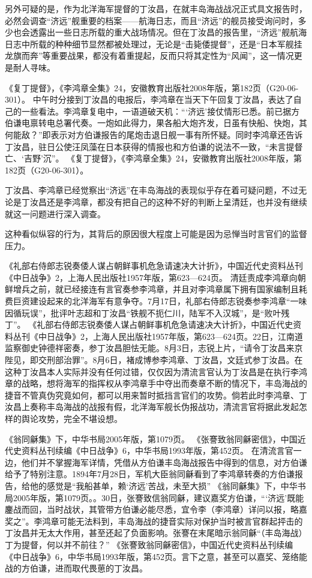 \documentclass[12pt,UTF8]{ctexbook}
\begin{document}
另外可疑的是，作为北洋海军提督的丁汝昌，在就丰岛海战战况正式具文报告时，必然会调查“济远”舰重要的档案——航海日志，而且“济远”的舰员接受询问时，多少也会透露出一些日志所载的重大战场情况。但在丁汝昌的报告里，“济远”舰航海日志中所载的种种细节显然都被处理过，无论是“击毙倭提督”，还是“日本军舰挂龙旗而奔”等重要战果，都没有着重提起，反而只将其定性为“风闻”，这一情况更是耐人寻味。

《复丁提督》，《李鸿章全集》24，安徽教育出版社2008年版，第182页（G20-06-301）。
中午时分接到丁汝昌的电报后，李鸿章在当天下午回复丁汝昌，表达了自己的一些看法。李鸿章复电中，一语道破天机：“‘济远’接仗情形已悉。前已据方伯谦电禀转电总署代奏。一炮如此得力，果各船大炮齐发，日虽有快船、快炮，其何能敌？”即表示对方伯谦报告的尾炮击退日舰一事有所怀疑。同时李鸿章还告诉丁汝昌，驻日公使汪凤藻在日本获得的情报也和方伯谦的说法不一致，“未言提督亡、‘吉野’沉”。 《复丁提督》，《李鸿章全集》24，安徽教育出版社2008年版，第182页（G20-06-301）。

丁汝昌、李鸿章已经觉察出“济远”在丰岛海战的表现似乎存在着可疑问题，不过无论是丁汝昌还是李鸿章，都没有把自己的这种不好的判断上呈清廷，也并没有继续就这一问题进行深入调查。

这种看似纵容的行为，其背后的原因很大程度上可能是因为忌惮当时言官们的监督压力。

《礼部右侍郎志锐奏倭人谋占朝鲜事机危急请速决大计折》，中国近代史资料丛刊《中日战争》2，上海人民出版社1957年版，第623—624页。
清廷责成李鸿章向朝鲜增兵之前，就已经接连有言官奏参李鸿章，并且对李鸿章属下拥有国家编制且耗费巨资建设起来的北洋海军有意争夺。7月17日，礼部右侍郎志锐奏参李鸿章“一味因循玩误”，批评叶志超和丁汝昌“铁舰不扼仁川，陆军不入汉城”，是“败叶残丁”。 《礼部右侍郎志锐奏倭人谋占朝鲜事机危急请速决大计折》，中国近代史资料丛刊《中日战争》2，上海人民出版社1957年版，第623—624页。22日，江南道监察御史钟德祥密奏，参丁汝昌胆怯无能。8月3日，志锐上片，“请令丁汝昌来京陛见，即交刑部治罪”。8月6日，褚成博参李鸿章、丁汝昌，文廷式参丁汝昌。在这种丁汝昌本人实际并没有任何过错，仅仅因为清流言官认为丁汝昌是在执行李鸿章的战略，想将海军的指挥权从李鸿章手中夺出而奏章不断的情况下，丰岛海战的捷音不管真伪究竟如何，都可以用来暂时抵挡言官们的攻势。倘若此时李鸿章、丁汝昌上奏称丰岛海战的战报有假，北洋海军舰长伪报战功，清流言官将据此发起怎样的舆论攻势，完全不堪设想。

《翁同龢集》下，中华书局2005年版，第1079页。
《张謇致翁同龢密信》，中国近代史资料丛刊续编《中日战争》6，中华书局1993年版，第452页。
在清流言官一边，他们并不掌握海军详情，凭借从方伯谦丰岛海战报告中得到的信息，对方伯谦给予了特别注意。1894年7月28日，军机大臣翁同龢看到了李鸿章转奏的方伯谦报告，给他的感觉是“我船甚单，赖‘济远’苦战，未至大损” 《翁同龢集》下，中华书局2005年版，第1079页。。30日，张謇致信翁同龢，建议嘉奖方伯谦，“‘济远’既能鏖战而回，当时战状，其管带方伯谦必能尽悉，宜令李（李鸿章）详问以报，略嘉奖之”。李鸿章可能无法料到，丰岛海战的捷音实际对保护当时被言官群起抨击的丁汝昌并无太大作用，甚至还起了负面影响。张謇在末尾暗示翁同龢“（丰岛海战）丁为提督，何以并不前往？” 《张謇致翁同龢密信》，中国近代史资料丛刊续编《中日战争》6，中华书局1993年版，第452页。言下之意，甚至可以嘉奖、笼络能战的方伯谦，进而取代畏葸的丁汝昌。
\end{document}
